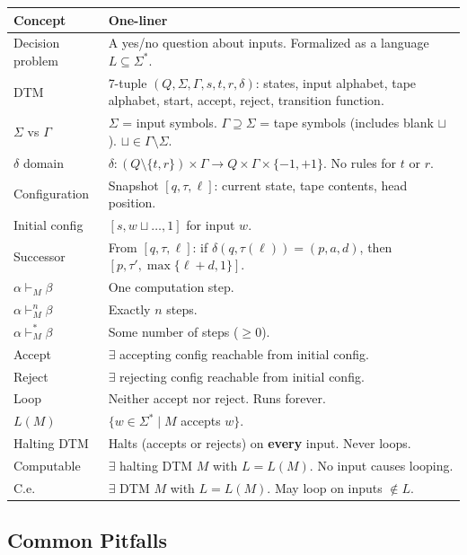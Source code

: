 \documentclass[11pt,a4paper]{article}
\begin{document}
\begin{center}
\renewcommand{\arraystretch}{1.5}
\begin{tabular}{lp{11cm}}
\toprule
\textbf{Concept} & \textbf{One-liner} \\
\midrule
Decision problem & A yes/no question about inputs. Formalized as a language $L \subseteq \Sigma^*$. \\
DTM & 7-tuple $(Q, \Sigma, \Gamma, s, t, r, \delta)$: states, input alphabet, tape alphabet, start, accept, reject, transition function. \\
$\Sigma$ vs $\Gamma$ & $\Sigma$ = input symbols. $\Gamma \supseteq \Sigma$ = tape symbols (includes blank $\sqcup$). $\sqcup \in \Gamma \setminus \Sigma$. \\
$\delta$ domain & $\delta\colon (Q \setminus \{t,r\}) \times \Gamma \to Q \times \Gamma \times \{-1,+1\}$. No rules for $t$ or $r$. \\
Configuration & Snapshot $[q, \tau, \ell]$: current state, tape contents, head position. \\
Initial config & $[s, w\sqcup\ldots, 1]$ for input $w$. \\
Successor & From $[q,\tau,\ell]$: if $\delta(q,\tau(\ell)) = (p,a,d)$, then $[p,\tau',\max\{\ell+d,1\}]$. \\
$\alpha \vdash_M \beta$ & One computation step. \\
$\alpha \vdash_M^n \beta$ & Exactly $n$ steps. \\
$\alpha \vdash_M^* \beta$ & Some number of steps ($\geq 0$). \\
Accept & $\exists$ accepting config reachable from initial config. \\
Reject & $\exists$ rejecting config reachable from initial config. \\
Loop & Neither accept nor reject. Runs forever. \\
$L(M)$ & $\{w \in \Sigma^* \mid M$ accepts $w\}$. \\
Halting DTM & Halts (accepts or rejects) on \textbf{every} input. Never loops. \\
Computable & $\exists$ halting DTM $M$ with $L = L(M)$. No input causes looping. \\
C.e. & $\exists$ DTM $M$ with $L = L(M)$. May loop on inputs $\notin L$. \\
\bottomrule
\end{tabular}
\end{center}

\subsection{Common Pitfalls}
\end{document}
